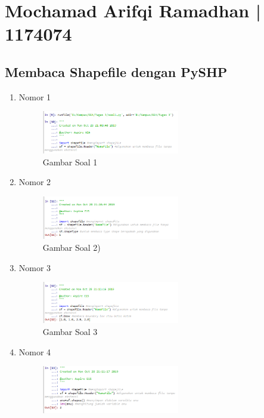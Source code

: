 \section{Mochamad Arifqi Ramadhan | 1174074}
\subsection{Membaca Shapefile dengan PySHP}
\begin{enumerate}
	\item Nomor 1
	
	\begin{figure}[H]
		\includegraphics[width=6cm]{figures/Tugas3/1174074/soal1.png}
		\centering
		\caption{Gambar Soal 1}
	\end{figure}
	\item Nomor 2
	
	\begin{figure}[H]
		\includegraphics[width=6cm]{figures/Tugas3/1174074/soal2.png}
		\centering
		\caption{Gambar Soal 2)}
	\end{figure}
	\item Nomor 3
	
	\begin{figure}[H]
		\includegraphics[width=6cm]{figures/Tugas3/1174074/soal3.png}
		\centering
		\caption{Gambar Soal 3}
	\end{figure}
	\item Nomor 4
	
	\begin{figure}[H]
		\includegraphics[width=6cm]{figures/Tugas3/1174074/soal4.png}

\end{figure}
\end{enumerate}
